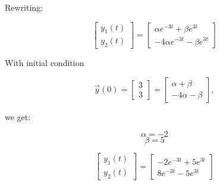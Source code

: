 \begin{enumerate}
{Rewriting:

 	\[\begin{bmatrix}y_1(t) \\ y_2(t)\end{bmatrix} = \begin{bmatrix}\alpha e^{-3t} + \beta e^{3t}  \\ -4\alpha e^{-3t}  - \beta e^{3t} \end{bmatrix}\]
 	
 	With initial condition
 	
 	\[\vec y(0) = \begin{bmatrix} 3 \\ 3 \end{bmatrix} =  \begin{bmatrix} \alpha + \beta \\ -4 \alpha -\beta \end{bmatrix},\]
 	
 	we get:
 	
 	\[\alpha=-2\]
 	\[\beta=5\]
 	
 	 	\[\begin{bmatrix}y_1(t) \\ y_2(t)\end{bmatrix} = \begin{bmatrix} -2e^{-3t} + 5e^{3t}  \\ 8e^{-3t}  -5  e^{3t} \end{bmatrix}\]
 	
}


\end{enumerate}